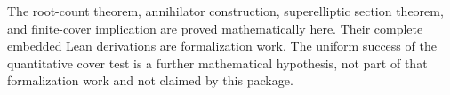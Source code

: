 The root-count theorem, annihilator construction, superelliptic
section theorem, and finite-cover implication are proved
mathematically here. Their complete embedded Lean derivations are
formalization work. The uniform success of the quantitative
cover test is a further mathematical hypothesis, not part of that
formalization work and not claimed by this package.

